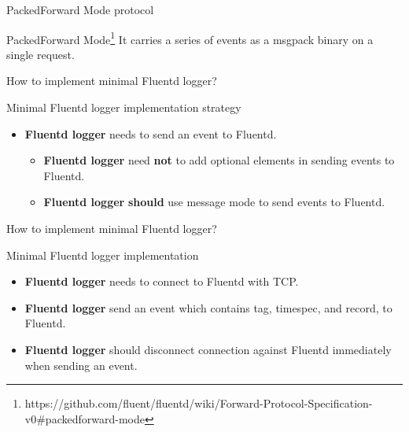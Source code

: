 \documentclass[12pt, unicode]{beamer}
\begin{document}
\begin{frame}{PackedForward Mode protocol}
\begin{block}{PackedForward Mode\footnote[frame]{https://github.com/fluent/fluentd/wiki/Forward-Protocol-Specification-v0\#packedforward-mode}}
It carries a series of events as a msgpack binary on a single request.
\end{block}
\begin{table}[htb]
\end{table}
\end{frame}

\begin{frame}{How to implement minimal Fluentd logger?}
\begin{block}{Minimal Fluentd logger implementation strategy}
\begin{itemize}
\item {} {{\textbf {Fluentd logger}} needs to send an event to Fluentd.}
  \begin{itemize}
  \item {} {{\textbf {Fluentd logger}} need {\textbf {not}} to add optional elements in sending events to Fluentd.}
  \item {} {{\textbf {Fluentd logger}} {\textbf {should}} use message mode to send events to Fluentd.}
  \end{itemize}
\end{itemize}
\end{block}
\end{frame}

\begin{frame}{How to implement minimal Fluentd logger?}
\begin{block}{Minimal Fluentd logger implementation}
\begin{itemize}
\item {} {{\textbf {Fluentd logger}} needs to connect to Fluentd with TCP.}
\item {} {{\textbf {Fluentd logger}} send an event which contains tag, timespec, and record, to Fluentd.}
\item {} {{\textbf {Fluentd logger}} should disconnect connection against Fluentd immediately when sending an event.}
\end{itemize}
\end{block}
\end{frame}
\end{document}
